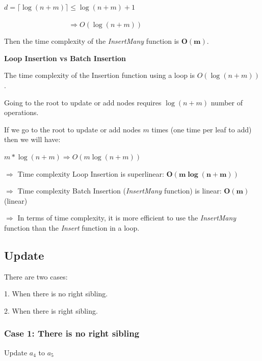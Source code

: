 \documentclass{article}
\begin{document}
$d = \lceil \log (n+m) \rceil \leq \log (n+m) + 1$



$\phantom{d = \lceil \log (n + m) \rceil} \Rightarrow O(\log (n+m))$

Then the time complexity of the \textit{InsertMany} function is $\boldsymbol{O(m)}$.



\textbf{Loop Insertion vs Batch Insertion}



The time complexity of the Insertion function using a loop is $O(\log (n+m))$.



Going to the root to update or add nodes requires $ \log (n+m)$ number of operations.

If we go to the root to update or add nodes $m$ times (one time per leaf to add) then we will have:



$m * \log (n+m) \Rightarrow \boxed{O(m \log (n+m))}$



$\Rightarrow$ Time complexity Loop Insertion is superlinear: $\boldsymbol{O(m \log (n+m))}$



$\Rightarrow$ Time complexity Batch Insertion (\textit{InsertMany} function) is linear: $\boldsymbol{O(m)}$ (linear)



$\Rightarrow$ In terms of time complexity, it is more efficient to use the \textit{InsertMany} function than the \textit{Insert} function in a loop.



\subsection{Update}

There are two cases:

1. When there is no right sibling.

2. When there is right sibling.

\subsubsection*{Case 1: There is no right sibling}



Update $a_4$ to $a_5$
\end{document}
